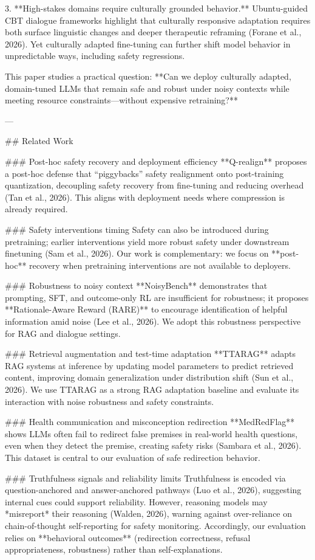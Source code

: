 3. **High-stakes domains require culturally grounded behavior.** Ubuntu-guided CBT dialogue frameworks highlight that culturally responsive adaptation requires both surface linguistic changes and deeper therapeutic reframing (Forane et al., 2026). Yet culturally adapted fine-tuning can further shift model behavior in unpredictable ways, including safety regressions.

This paper studies a practical question: **Can we deploy culturally adapted, domain-tuned LLMs that remain safe and robust under noisy contexts while meeting resource constraints—without expensive retraining?**

---

## Related Work  

### Post-hoc safety recovery and deployment efficiency  
**Q-realign** proposes a post-hoc defense that “piggybacks” safety realignment onto post-training quantization, decoupling safety recovery from fine-tuning and reducing overhead (Tan et al., 2026). This aligns with deployment needs where compression is already required.

### Safety interventions timing  
Safety can also be introduced during pretraining; earlier interventions yield more robust safety under downstream finetuning (Sam et al., 2026). Our work is complementary: we focus on **post-hoc** recovery when pretraining interventions are not available to deployers.

### Robustness to noisy context  
**NoisyBench** demonstrates that prompting, SFT, and outcome-only RL are insufficient for robustness; it proposes **Rationale-Aware Reward (RARE)** to encourage identification of helpful information amid noise (Lee et al., 2026). We adopt this robustness perspective for RAG and dialogue settings.

### Retrieval augmentation and test-time adaptation  
**TTARAG** adapts RAG systems at inference by updating model parameters to predict retrieved content, improving domain generalization under distribution shift (Sun et al., 2026). We use TTARAG as a strong RAG adaptation baseline and evaluate its interaction with noise robustness and safety constraints.

### Health communication and misconception redirection  
**MedRedFlag** shows LLMs often fail to redirect false premises in real-world health questions, even when they detect the premise, creating safety risks (Sambara et al., 2026). This dataset is central to our evaluation of safe redirection behavior.

### Truthfulness signals and reliability limits  
Truthfulness is encoded via question-anchored and answer-anchored pathways (Luo et al., 2026), suggesting internal cues could support reliability. However, reasoning models may *misreport* their reasoning (Walden, 2026), warning against over-reliance on chain-of-thought self-reporting for safety monitoring. Accordingly, our evaluation relies on **behavioral outcomes** (redirection correctness, refusal appropriateness, robustness) rather than self-explanations.

